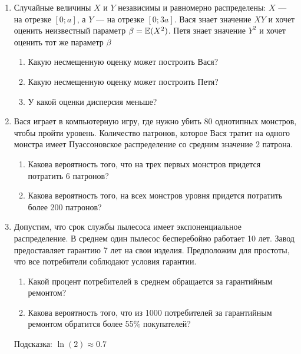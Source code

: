 \begin{enumerate}

\item Случайные величины $X$ и $Y$ независимы и равномерно распределены: $X$ —
на отрезке $[0;a]$, а $Y$ — на отрезке $[0;3a]$.
Вася знает значение $XY$ и хочет оценить неизвестный параметр $\beta=\operatorname{\mathbb{E}}(X^{2})$.
Петя знает значение $Y^2$ и хочет оценить тот же параметр $\beta$
\begin{enumerate}
\item Какую несмещенную оценку может построить Вася?
\item Какую несмещенную оценку может построить Петя?
\item У какой оценки дисперсия меньше?
\end{enumerate}


\item Вася играет в компьютерную игру, где нужно убить 80 однотипных монстров,
чтобы пройти уровень. Количество патронов, которое Вася тратит на одного монстра
имеет Пуассоновское распределение со средним значение 2 патрона.
\begin{enumerate}
\item Какова вероятность того, что на трех первых монстров придется потратить 6 патронов?
\item Какова вероятность того, на всех монстров уровня придется потратить более 200 патронов?
\end{enumerate}

\item Допустим, что срок службы пылесоса имеет экспоненциальное распределение.
В среднем один пылесос бесперебойно работает 10 лет. Завод предоставляет гарантию
7 лет на свои изделия. Предположим для простоты, что все потребители соблюдают
условия гарантии.
\begin{enumerate}
\item Какой процент потребителей в среднем обращается за гарантийным ремонтом?
\item Какова вероятность того, что из 1000 потребителей за гарантийным ремонтом
обратится более 55\% покупателей?
\end{enumerate}
Подсказка: $\ln(2)\approx 0.7$


\end{enumerate}
